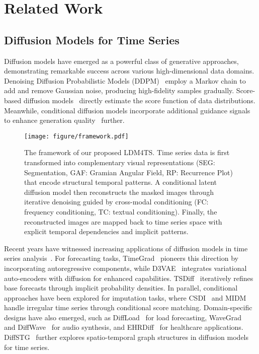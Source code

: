 \vspace{-1em}
\section{Related Work}
\vspace{-0.2em}
\subsection{Diffusion Models for Time Series}
Diffusion models have emerged as a powerful class of generative approaches, demonstrating remarkable success across various high-dimensional data domains. Denoising Diffusion Probabilistic Models (DDPM)~\cite{ho2020denoising} employ a Markov chain to add and remove Gaussian noise, producing high-fidelity samples gradually. Score-based diffusion models~\cite{song2020score} directly estimate the score function of data distributions. Meanwhile, conditional diffusion models incorporate additional guidance signals to enhance generation quality~\cite{dhariwal2021diffusion} further.
\begin{figure*}[t]
  \centering
  \texttt{[image: figure/framework.pdf]}
  \caption{The framework of our proposed LDM4TS. Time series data is first transformed into complementary visual representations (SEG: Segmentation, GAF: Gramian Angular Field, RP: Recurrence Plot) that encode structural temporal patterns. A conditional latent diffusion model then reconstructs the masked images through iterative denoising guided by cross-modal conditioning (FC: frequency conditioning, TC: textual conditioning). Finally, the reconstructed images are mapped back to time series space with explicit temporal dependencies and implicit patterns.}
\vspace{-0.4cm}
\label{fig:framework}
\end{figure*}

Recent years have witnessed increasing applications of diffusion models in time series analysis~\cite{yang2024survey,lin2024diffusion}. For forecasting tasks, TimeGrad~\cite{rasul2021autoregressive} pioneers this direction by incorporating autoregressive components, while D3VAE~\cite{li2022generative} integrates variational auto-encoders with diffusion for enhanced capabilities. TSDiff~\cite{kollovieh2024predict} iteratively refines base forecasts through implicit probability densities. In parallel, conditional approaches have been explored for imputation tasks, where CSDI~\cite{tashiro2021csdi} and MIDM~\cite{wang2023observed} handle irregular time series through conditional score matching. Domain-specific designs have also emerged, such as DiffLoad~\cite{wang2023diffload} for load forecasting, WaveGrad~\cite{chen2020wavegrad} and DiffWave~\cite{kong2020diffwave} for audio synthesis, and EHRDiff~\cite{yuan2023ehrdiff} for healthcare applications. DiffSTG~\cite{wen2023diffstg} further explores spatio-temporal graph structures in diffusion models for time series.

